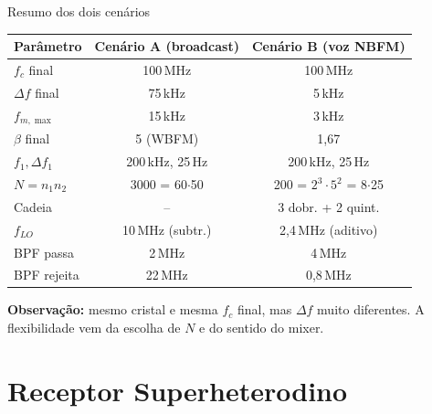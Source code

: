 \begin{frame}{Resumo dos dois cenários}

\begin{center}
\footnotesize
\begin{tabular}{lcc}
\toprule
Parâmetro & Cenário A (broadcast) & Cenário B (voz NBFM) \\
\midrule
$f_c$ final            & 100\,MHz       & 100\,MHz       \\
$\Delta f$ final       & 75\,kHz        & 5\,kHz         \\
$f_{m,\max}$           & 15\,kHz        & 3\,kHz         \\
$\beta$ final          & 5 (WBFM)       & 1{,}67         \\
\midrule
$f_1, \Delta f_1$      & 200\,kHz, 25\,Hz & 200\,kHz, 25\,Hz \\
$N = n_1 n_2$          & 3000 = 60$\cdot$50 & 200 = $2^3\cdot 5^2$ = 8$\cdot$25 \\
Cadeia                 & --                 & 3 dobr. + 2 quint. \\
$f_{LO}$               & 10\,MHz (subtr.)   & 2{,}4\,MHz (aditivo) \\
BPF passa              & 2\,MHz             & 4\,MHz         \\
BPF rejeita            & 22\,MHz            & 0{,}8\,MHz     \\
\bottomrule
\end{tabular}
\end{center}

\small
\textbf{Observação:} mesmo cristal e mesma $f_c$ final, mas $\Delta f$ muito diferentes. A flexibilidade vem da escolha de $N$ e do sentido do mixer.

\end{frame}


\section{Receptor Superheterodino}


